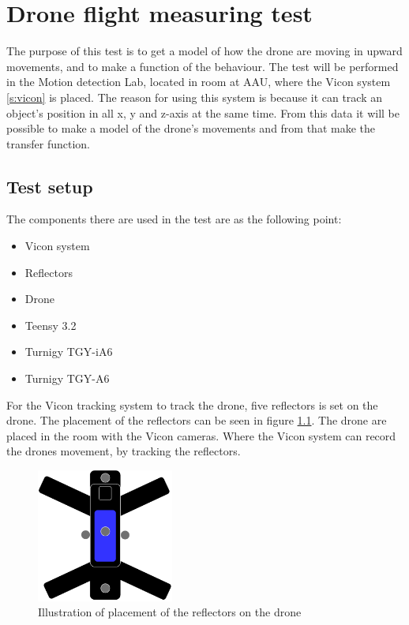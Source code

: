 \chapter{Drone flight measuring test}\label{ap:drone_flight_test}
The purpose of this test is to get a model of how the drone are moving in upward movements, and to make a function of the behaviour. The test will be performed in the Motion detection Lab, located in room  at AAU, where the Vicon system \ref{s:vicon} is placed. The reason for using this system is because it can track an object's position in all x, y and z-axis at the same time. From this data it will be possible to make a model of the drone's movements and from that make the transfer function.

\section*{Test setup}
The components there are used in the test are as the following point:
\begin{itemize}
    \item{Vicon system}
    \item{Reflectors}
    \item{Drone}
    \item{Teensy 3.2} %
    \item{Turnigy TGY-iA6} %
    \item{Turnigy TGY-A6} %
\end{itemize}
For the Vicon tracking system to track the drone, five reflectors is set on the drone. The placement of the reflectors can be seen in figure \ref{fig:reflectors}.
The drone are placed in the room with the Vicon cameras. Where the Vicon system can record the drones movement, by tracking the reflectors. 

\begin{figure}[H]
    \centering
    \includegraphics[width=0.4\textwidth]{figures/Appendix/measuringTest/Reflector1.pdf}
    \caption{Illustration of placement of the reflectors on the drone}
    \label{fig:reflectors}
\end{figure}


